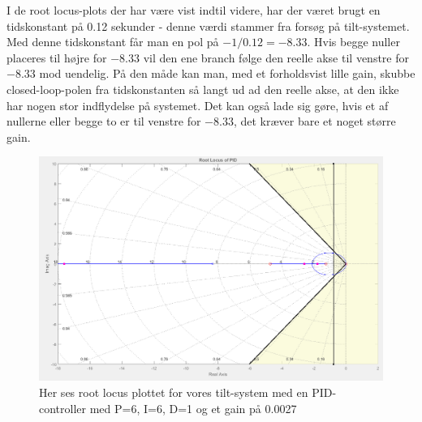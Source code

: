 I de root locus-plots der har være vist indtil videre, har der været brugt en tidskonstant på 0.12 sekunder - denne værdi stammer fra forsøg på tilt-systemet. Med denne tidskonstant får man en pol på $-1/0.12=-8.33$. Hvis begge nuller placeres til højre for $-8.33$ vil den ene branch følge den reelle akse til venstre for $-8.33$ mod uendelig. På den måde kan man, med et forholdsvist lille gain, skubbe closed-loop-polen fra tidskonstanten så langt ud ad den reelle akse, at den ikke har nogen stor indflydelse på systemet. Det kan også lade sig gøre, hvis et af nullerne eller begge to er til venstre for $-8.33$, det kræver bare et noget større gain.

\begin{figure}[ht]
	\begin{center}
		\includegraphics[scale=0.45]{Billeder/PID_rlocus.PNG}
	\end{center}
\caption{Her ses root locus plottet for vores tilt-system med en PID-controller med P=6, I=6, D=1 og et gain på 0.0027}
\label{fig:PID_rlocus}
\end{figure}